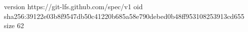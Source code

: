 version https://git-lfs.github.com/spec/v1
oid sha256:39122e03b8f9547db50c41220b685a58e790debed0b48ff953108253913cd655
size 62
